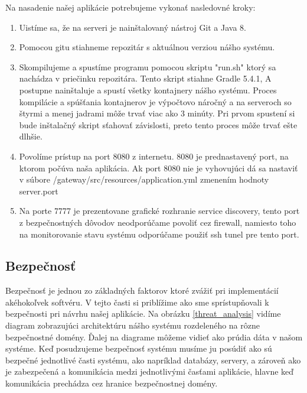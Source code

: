 Na nasadenie našej aplikácie potrebujeme vykonať nasledovné kroky:
\begin{enumerate}
    \item Uistíme sa, že na serveri je nainštalovaný nástroj Git a Java 8.
	\item Pomocou gitu stiahneme repozitár \cite{dp_repo} s aktuálnou verziou nášho systému.
    \item Skompilujeme a spustíme programu pomocou skriptu "run.sh" ktorý sa nachádza v priečinku repozitára. Tento skript stiahne Gradle 5.4.1, A postupne nainštaluje a spustí všetky kontajnery nášho systému.
	Proces kompilácie a spúšťania kontajnerov je výpočtovo náročný a na serveroch so štyrmi a menej jadrami môže trvať viac ako 3 minúty. Pri prvom spustení si bude inštalačný skript sťahovať závislosti, preto tento proces môže trvať ešte dlhšie.
    \item Povolíme prístup na port 8080 z internetu. 8080 je prednastavený port, na ktorom počúva naša aplikácia. Ak port 8080 nie je vyhovujúci dá sa nastaviť v súbore /gateway/src/resources/application.yml zmenením hodnoty server.port
    \item Na porte 7777 je prezentovane grafické rozhranie service discovery, tento port z bezpečnostných dôvodov neodporúčame povoliť cez firewall, namiesto toho na monitorovanie stavu systému odporúčame použiť ssh tunel pre tento port.
\end{enumerate}



\subsection{Bezpečnosť}
Bezpečnosť je jednou zo základných faktorov ktoré zvážiť pri implementácií akéhokoľvek softvéru. V tejto časti si priblížime ako sme sprístupňovali k bezpečnosti pri návrhu našej aplikácie.  Na obrázku \ref{threat_analysis} vidíme diagram zobrazujúci architektúru nášho systému rozdeleného na rôzne bezpečnostné domény. Ďalej na diagrame môžeme vidieť ako prúdia dáta v našom systéme.  Keď posudzujeme bezpečnosť systému musíme ju posúdiť ako sú bezpečné jednotlivé časti systému, ako napríklad databázy, servery, a zároveň ako je zabezpečená a komunikácia medzi jednotlivými časťami aplikácie, hlavne keď komunikácia prechádza cez hranice bezpečnostnej domény.  


